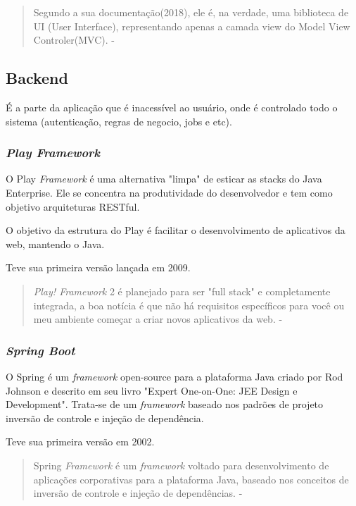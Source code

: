 \begin{quote}
  Segundo a sua documentação(2018), ele é, na  verdade,  uma  biblioteca  de  UI  (User  Interface),  representando  apenas  a  camada view do Model  View  Controler(MVC).  - \cite{ferreira2018analise}
\end{quote}

\subsection{Backend}

É a parte da aplicação que é inacessível ao usuário, onde é controlado todo o sistema (autenticação, regras de negocio, jobs e etc).

\subsubsection{\textit{Play Framework}}

O Play \textit{Framework} é uma alternativa "limpa" de esticar as stacks do Java Enterprise. Ele se concentra na produtividade do desenvolvedor e tem como objetivo arquiteturas RESTful. 

O objetivo da estrutura do Play é facilitar o desenvolvimento de aplicativos da web, mantendo o Java.

Teve sua primeira versão lançada em 2009.

\begin{quote}
\textit{Play! Framework} 2 é planejado para ser "full stack" e completamente integrada, a boa notícia é que não há requisitos específicos para você ou meu ambiente começar a criar novos aplicativos da web. - \cite{petrella2013learning}
\end{quote}

\subsubsection{\textit{Spring Boot}}

O Spring é um \textit{framework} open-source para a plataforma Java criado por Rod Johnson e descrito em seu livro "Expert One-on-One: JEE Design e Development".
Trata-se de um \textit{framework} baseado nos padrões de projeto inversão de controle e injeção de dependência.

Teve sua primeira versão em 2002.

\begin{quote}
  Spring \textit{Framework} é um \textit{framework} voltado para desenvolvimento de aplicações corporativas para a plataforma Java, baseado nos conceitos de inversão de controle e injeção de dependências. - \cite{weissmann2014vire}
\end{quote}


